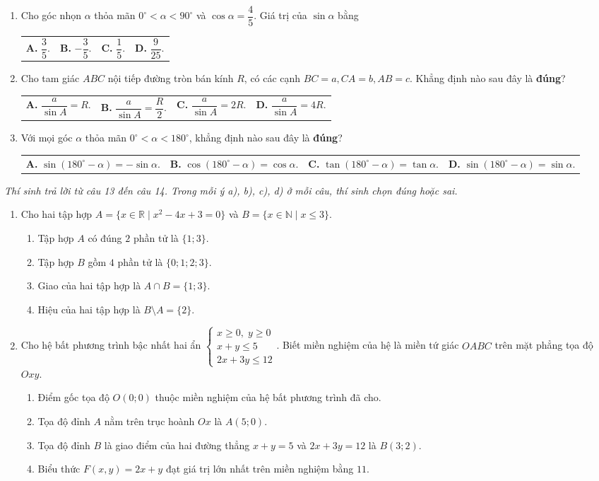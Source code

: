\documentclass[12pt,a4paper]{article}
\makeatletter
\newcommand{\parttitle}[1]{\par\vspace{2pt}{\large\bfseries\color{ink}#1}\par\vspace{1pt}}
\newcommand{\four}[4]{\par\noindent\begin{tabularx}{\linewidth}{@{}*{4}{>{\raggedright\arraybackslash}X}@{}}\textbf{A.} #1&\textbf{B.} #2&\textbf{C.} #3&\textbf{D.} #4\end{tabularx}}
\makeatother
\begin{document}
\begin{enumerate}
\item Cho góc nhọn $\alpha$ thỏa mãn $0^\circ < \alpha < 90^\circ$ và $\cos \alpha = \dfrac{4}{5}$. Giá trị của $\sin \alpha$ bằng
\four{$\dfrac{3}{5}$.}{$-\dfrac{3}{5}$.}{$\dfrac{1}{5}$.}{$\dfrac{9}{25}$.}

\item Cho tam giác $ABC$ nội tiếp đường tròn bán kính $R$, có các cạnh $BC = a, CA = b, AB = c$. Khẳng định nào sau đây là \textbf{đúng}?
\four{$\dfrac{a}{\sin A} = R$.}{$\dfrac{a}{\sin A} = \dfrac{R}{2}$.}{$\dfrac{a}{\sin A} = 2R$.}{$\dfrac{a}{\sin A} = 4R$.}

\item Với mọi góc $\alpha$ thỏa mãn $0^\circ < \alpha < 180^\circ$, khẳng định nào sau đây là \textbf{đúng}?
\four{$\sin(180^\circ - \alpha) = -\sin \alpha$.}{$\cos(180^\circ - \alpha) = \cos \alpha$.}{$\tan(180^\circ - \alpha) = \tan \alpha$.}{$\sin(180^\circ - \alpha) = \sin \alpha$.}
\end{enumerate}

\parttitle{PHẦN II. Trắc nghiệm đúng/sai}
\textit{Thí sinh trả lời từ câu 13 đến câu 14. Trong mỗi ý a), b), c), d) ở mỗi câu, thí sinh chọn đúng hoặc sai.}
\begin{enumerate}[resume]
\item Cho hai tập hợp $A = \{x \in \mathbb{R} \mid x^2 - 4x + 3 = 0\}$ và $B = \{x \in \mathbb{N} \mid x \le 3\}$.
\begin{enumerate}
    \item Tập hợp $A$ có đúng $2$ phần tử là $\{1; 3\}$.
    \item Tập hợp $B$ gồm $4$ phần tử là $\{0; 1; 2; 3\}$.
    \item Giao của hai tập hợp là $A \cap B = \{1; 3\}$.
    \item Hiệu của hai tập hợp là $B \setminus A = \{2\}$.
\end{enumerate}

\item Cho hệ bất phương trình bậc nhất hai ẩn $\begin{cases} x \ge 0,\; y \ge 0 \\ x + y \le 5 \\ 2x + 3y \le 12 \end{cases}$. Biết miền nghiệm của hệ là miền tứ giác $OABC$ trên mặt phẳng tọa độ $Oxy$.
\begin{enumerate}
    \item Điểm gốc tọa độ $O(0; 0)$ thuộc miền nghiệm của hệ bất phương trình đã cho.
    \item Tọa độ đỉnh $A$ nằm trên trục hoành $Ox$ là $A(5; 0)$.
    \item Tọa độ đỉnh $B$ là giao điểm của hai đường thẳng $x + y = 5$ và $2x + 3y = 12$ là $B(3; 2)$.
    \item Biểu thức $F(x, y) = 2x + y$ đạt giá trị lớn nhất trên miền nghiệm bằng $11$.
\end{enumerate}
\end{enumerate}
\end{document}
